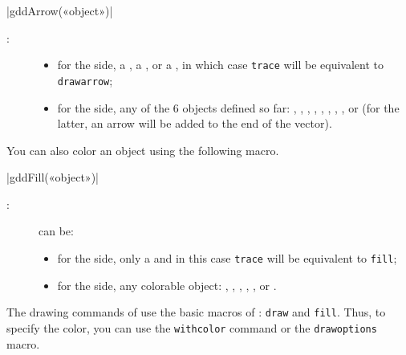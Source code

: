 \documentclass[a4paper,english]{article}
\begin{document}
\begin{colourband}
\macro|gddArrow(«object»)|
\begin{description}
  \item[:] 
  \begin{itemize}
    \item for the \MP{} side, a , a
  , or a , in which case \lstinline+trace+ will be
  equivalent to \lstinline+drawarrow+;
    \item for the \mpgeomdd side,
  any of the 6 objects defined so far: ,
  , , , ,
  , ,
  , or  (for the latter, an arrow will be
  added to the end of the vector).
  \end{itemize}
\end{description}
\end{colourband}

You can also color an object using the following macro.
\begin{colourband}
\macro|gddFill(«object»)|
\begin{description}
  \item[:] can be:
  \begin{itemize}
    \item for the \MP{} side, only a  and in this case \lstinline+trace+ will be equivalent to \lstinline+fill+;
    \item for the \mpgeomdd side,
  any colorable object: ,
   , , , , or
  .
  \end{itemize}
\end{description}
\end{colourband}


The drawing commands of \mpgeomdd use the basic macros of \MP{}: \lstinline+draw+ and \lstinline+fill+. Thus, to specify the color, you can use the \lstinline+withcolor+ command or the \lstinline+drawoptions+ macro.
\end{document}
